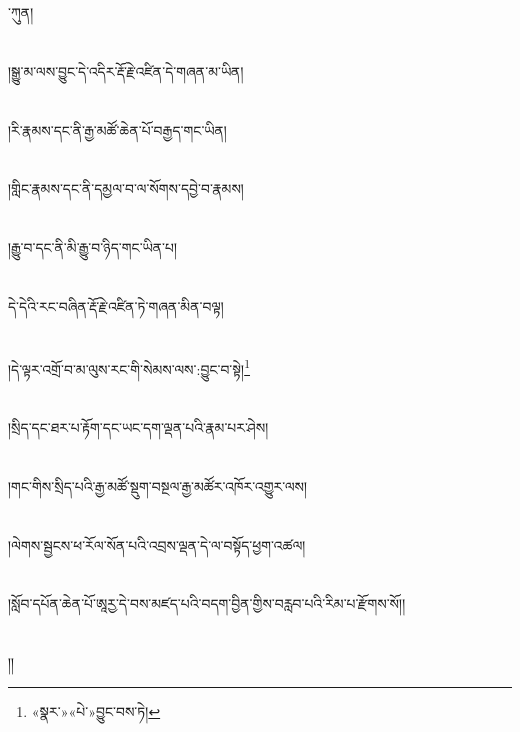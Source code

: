 ་ཀུན།\chapter{ }།སྒྱུ་མ་ལས་བྱུང་དེ་འདིར་རྡོ་རྗེ་འཛིན་དེ་གཞན་མ་ཡིན།\chapter{ }།རི་རྣམས་དང་ནི་རྒྱ་མཚོ་ཆེན་པོ་བརྒྱད་གང་ཡིན།\chapter{ }།གླིང་རྣམས་དང་ནི་དམྱལ་བ་ལ་སོགས་དབྱེ་བ་རྣམས།\chapter{ }།རྒྱུ་བ་དང་ནི་མི་རྒྱུ་བ་ཉིད་གང་ཡིན་པ།\chapter{ }དེ་དེའི་རང་བཞིན་རྡོ་རྗེ་འཛིན་ཏེ་གཞན་མིན་བལྟ།\chapter{ }།དེ་ལྟར་འགྲོ་བ་མ་ལུས་རང་གི་སེམས་ལས་:བྱུང་བ་སྟེ།\footnote{«སྣར་»«པེ་»བྱུང་བས་ཏེ།}\chapter{ }།སྲིད་དང་ཐར་པ་རྟོག་དང་ཡང་དག་ལྡན་པའི་རྣམ་པར་ཤེས།\chapter{ }།གང་གིས་སྲིད་པའི་རྒྱ་མཚོ་སྡུག་བསྔལ་རྒྱ་མཚོར་འཁོར་འགྱུར་ལས།\chapter{ }།ལེགས་སྦྱངས་ཕ་རོལ་སོན་པའི་འབྲས་ལྡན་དེ་ལ་བསྟོད་ཕྱག་འཚལ།\chapter{ }།སློབ་དཔོན་ཆེན་པོ་ཨཱརྱ་དེ་བས་མཛད་པའི་བདག་བྱིན་གྱིས་བརླབ་པའི་རིམ་པ་རྫོགས་སོ།།\chapter{ }།།